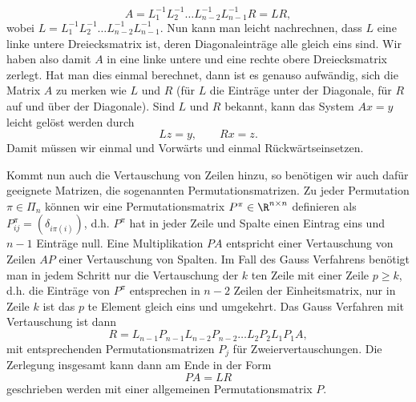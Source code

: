 \begin{equation*}
 A =  L_1^{-1}   L_2^{-1} \ldots  L_{n-2}^{-1} L_{n-1}^{-1} R  = L R,
\end{equation*}
wobei \(L= L_1^{-1}   L_2^{-1} \ldots  L_{n-2}^{-1} L_{n-1}^{-1}\). Nun kann man leicht nachrechnen, dass \(L\) eine linke untere Dreiecksmatrix ist, deren Diagonaleinträge alle gleich eins sind. Wir haben also damit \(A\) in eine linke untere und eine rechte obere Dreiecksmatrix zerlegt. Hat man dies einmal berechnet, dann ist es genauso aufwändig, sich die Matrix \(A\) zu merken wie \(L\) und \(R\) (für \(L\) die Einträge unter der Diagonale, für \(R\) auf und über der Diagonale). Sind \(L\) und \(R\) bekannt, kann das System \(Ax=y\) leicht gelöst werden durch
\begin{equation*}
 L z = y, \qquad Rx = z.
\end{equation*}
Damit müssen wir einmal und Vorwärts  und einmal Rückwärtseinsetzen.

Kommt nun auch die Vertauschung von Zeilen hinzu, so benötigen wir auch dafür geeignete Matrizen, die sogenannten Permutationsmatrizen. Zu jeder Permutation \(\pi \in \Pi_n\) können wir eine Permutationsmatrix \(P^\pi \in \R^{n \times n}\) definieren als \(P_{ij}^\pi = (\delta_{i\pi(i)})\), d.h. \(P^\pi\) hat in jeder Zeile und Spalte einen Eintrag eins und \(n-1\) Einträge null. Eine Multiplikation \(PA\) entspricht einer Vertauschung von Zeilen \(AP\) einer Vertauschung von Spalten. Im Fall des Gauss Verfahrens benötigt man in jedem Schritt nur die Vertauschung der \(k\) ten Zeile mit einer Zeile \(p \geq k\), d.h. die Einträge von \(P^\pi\) entsprechen in \(n-2\) Zeilen der Einheitsmatrix, nur in Zeile \(k\) ist das \(p\) te Element gleich eins und umgekehrt. Das Gauss Verfahren mit Vertauschung ist dann
\begin{equation*}
 R=L_{n-1} P_{n-1} L_{n-2} P_{n-2}\ldots L_2 P_2 L_1 P_1 A ,
\end{equation*}
mit entsprechenden Permutationsmatrizen \(P_j\) für Zweiervertauschungen. Die Zerlegung insgesamt kann dann am Ende in der Form
\begin{equation*}
 P A = L R
\end{equation*}
geschrieben werden mit einer allgemeinen Permutationsmatrix \(P\).


